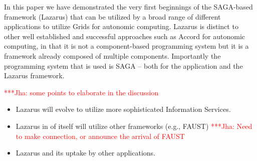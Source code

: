 \documentclass[conference,final]{IEEEtran}
\newcommand{\jhanote}[1]{ {\textcolor{red} { ***Jha: #1 }}}
\newcommand{\jhanote}[1]{}
\begin{document}
In this paper we have demonstrated the very first beginnings of the
SAGA-based framework (Lazarus) that can be utilized by a broad range
of different applications to utilize Grids for autonomic computing.
Lazarus is distinct to other well established and successful
approaches such as Accord for autonomic computing, in that it is not a
component-based programming system but it is a framework already
composed of multiple components. Importantly the programming system
that is used is SAGA -- both for the application and the Lazarus
framework.

\jhanote{some points to elaborate in the discussion}

\begin{itemize}
\item Lazarus will evolve to utilize more sophisticated Information Services.
\item Lazarus in of itself will utilize other frameworks (e.g., FAUST)
\jhanote{Need to make connection, or announce the arrival of FAUST}
\item Lazarus and its uptake by other applications.
\end{itemize}







\end{document}
